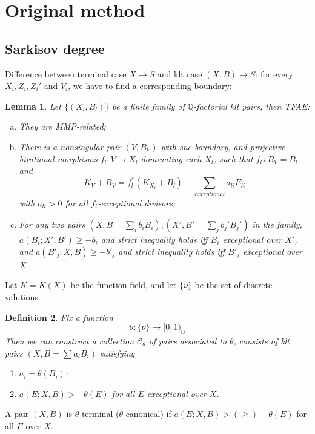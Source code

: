 \documentclass{article}
\newtheorem{defn}{Definition}[section]
\newtheorem{lem}[defn]{Lemma}
\begin{document}
\section{Original method}

\subsection{Sarkisov degree}
Difference between terminal case $ X\to S $ and klt case $ (X,B)\to S $: for every $ X_i,Z_i,Z_i' $ and $ V_i $, we have to find a corresponding boundary:

\begin{lem}
  Let $ \{(X_l,B_l)\} $ be a finite family of $ \mathbb{Q} $-factorial klt pairs, then TFAE:
  \begin{enumerate}[(a)]
    \item They are MMP-related;
    \item There is a nonsingular pair $ (V,B_V) $ with snc boundary, and projective birational morphisms $ f_l:V\to  X_l $ dominating each $ X_l $, such that $ f_{l*}B_V=B_l $ and
      $$ K_V+B_V=f_l^*(K_{X_l}+B_l)+\sum_{exceptional}{a_{li}E_{li}} $$
      with $ a_{li}>0 $ for all $ f_i $-exceptional divisors;
    \item For any two pairs $ (X,B=\sum_ib_iB_i),(X',B'=\sum _jb_j'B_j') $ in the family,  $ a(B_i;X',B')\geqslant -b_i $ and strict inequality holds iff $ B_i $ exceptional over $ X' $, and $ a(B'_j;X,B)\geqslant -b'_j $ and strict inequality holds iff $ B'_j $ exceptional over $ X $
  \end{enumerate}
\end{lem}
Let $ K=K(X) $ be the function field, and let $ \{\nu\} $ be the set of discrete valutions.
\begin{defn}
  Fix a function
  $$ \theta:\{\nu\}\to [0,1)_\mathbb{Q} $$
  Then we can construct a collection $ \mathcal{C}_\theta $ of pairs  associated to $ \theta $, consists of klt pairs $ (X,B=\sum a_iB_i) $ satisfying
  \begin{enumerate}
    \item $ a_i=\theta(B_i) $;
    \item $ a(E;X,B)>-\theta(E) $ for all $ E $ exceptional over $ X $.
  \end{enumerate}
\end{defn}
A pair $ (X,B) $ is $ \theta $-terminal ($ \theta $-canonical) if $ a(E;X,B)>(\geqslant)-\theta(E) $ for all $ E $ over $ X $.
\end{document}
